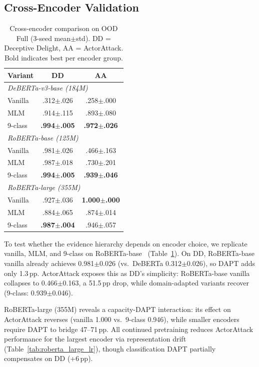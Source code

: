 \subsection{Cross-Encoder Validation}
\label{sec:cross_encoder}

\begin{table}[t]
\centering
\small
\caption{Cross-encoder comparison on OOD Full (3-seed mean$\pm$std). DD = Deceptive Delight, AA = ActorAttack. Bold indicates best per encoder group.}
\label{tab:cross_encoder}
\begin{tabular}{@{}lcc@{}}
\toprule
\textbf{Variant} & DD & AA \\
\midrule
\multicolumn{3}{l}{\textit{DeBERTa-v3-base (184M)}} \\[2pt]
Vanilla & .312$\pm$.026 & .258$\pm$.000 \\
MLM & .914$\pm$.115 & .893$\pm$.080 \\
9-class & \textbf{.994$\pm$.005} & \textbf{.972$\pm$.026} \\
\midrule
\multicolumn{3}{l}{\textit{RoBERTa-base (125M)}} \\[2pt]
Vanilla & .981$\pm$.026 & .466$\pm$.163 \\
MLM & .987$\pm$.018 & .730$\pm$.201 \\
9-class & \textbf{.994$\pm$.005} & \textbf{.939$\pm$.046} \\
\midrule
\multicolumn{3}{l}{\textit{RoBERTa-large (355M)}} \\[2pt]
Vanilla & .927$\pm$.036 & \textbf{1.000$\pm$.000} \\
MLM & .884$\pm$.065 & .874$\pm$.014 \\
9-class & \textbf{.987$\pm$.004} & .946$\pm$.057 \\
\bottomrule
\end{tabular}
\end{table}

To test whether the evidence hierarchy depends on encoder choice, we replicate vanilla, MLM, and 9-class on RoBERTa-base~\citep{liu2019roberta} (Table~\ref{tab:cross_encoder}).
On DD, RoBERTa-base vanilla already achieves 0.981$\pm$0.026 (vs.\ DeBERTa 0.312$\pm$0.026), so DAPT adds only 1.3\,pp. ActorAttack exposes this as DD's simplicity: RoBERTa-base vanilla collapses to 0.466$\pm$0.163, a 51.5\,pp drop, while domain-adapted variants recover (9-class: 0.939$\pm$0.046).

RoBERTa-large (355M) reveals a capacity-DAPT interaction: its effect on ActorAttack reverses (vanilla 1.000 vs.\ 9-class 0.946), while smaller encoders require DAPT to bridge 47--71\,pp. All continued pretraining reduces ActorAttack performance for the largest encoder via representation drift (Table~\ref{tab:roberta_large_lr}), though classification DAPT partially compensates on DD (+6\,pp).

